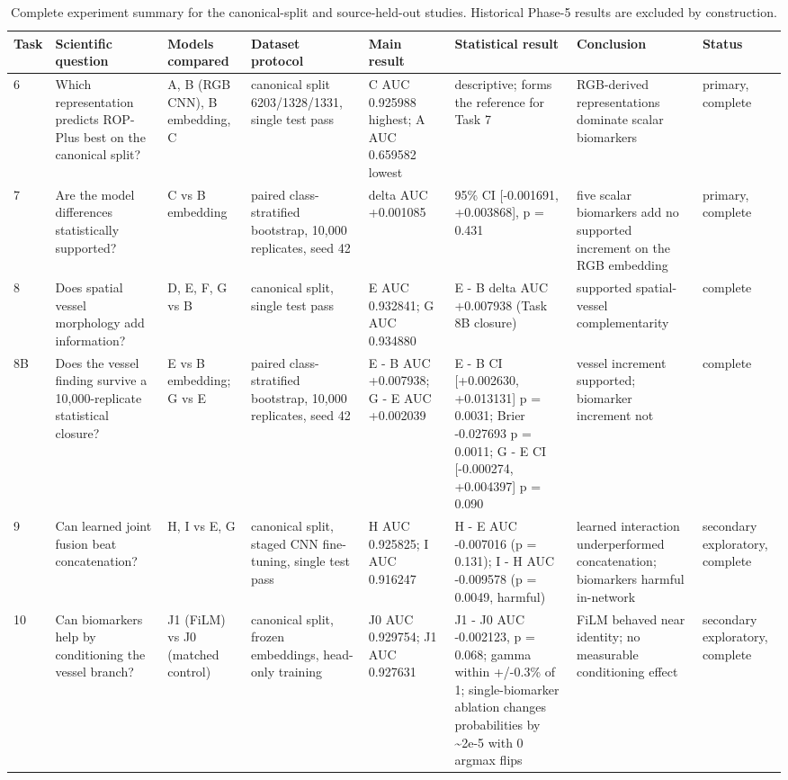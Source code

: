 \begin{table}[htbp]
\centering
\small
\caption{Complete experiment summary for the canonical-split and source-held-out studies. Historical Phase-5 results are excluded by construction.}
\label{tab:experimentsummary}
\begin{tabular}{lp{3.4cm}p{3.0cm}p{3.2cm}p{3.2cm}p{4.0cm}p{3.4cm}p{2.2cm}}
\toprule
Task & Scientific question & Models compared & Dataset protocol & Main result & Statistical result & Conclusion & Status \\
\midrule
6 & Which representation predicts ROP-Plus best on the canonical split? & A, B (RGB CNN), B embedding, C & canonical split 6203/1328/1331, single test pass & C AUC 0.925988 highest; A AUC 0.659582 lowest & descriptive; forms the reference for Task 7 & RGB-derived representations dominate scalar biomarkers & primary, complete \\
7 & Are the model differences statistically supported? & C vs B embedding & paired class-stratified bootstrap, 10,000 replicates, seed 42 & delta AUC +0.001085 & 95\% CI [-0.001691, +0.003868], p = 0.431 & five scalar biomarkers add no supported increment on the RGB embedding & primary, complete \\
8 & Does spatial vessel morphology add information? & D, E, F, G vs B & canonical split, single test pass & E AUC 0.932841; G AUC 0.934880 & E - B delta AUC +0.007938 (Task 8B closure) & supported spatial-vessel complementarity & complete \\
8B & Does the vessel finding survive a 10,000-replicate statistical closure? & E vs B embedding; G vs E & paired class-stratified bootstrap, 10,000 replicates, seed 42 & E - B AUC +0.007938; G - E AUC +0.002039 & E - B CI [+0.002630, +0.013131] p = 0.0031; Brier -0.027693 p = 0.0011; G - E CI [-0.000274, +0.004397] p = 0.090 & vessel increment supported; biomarker increment not & complete \\
9 & Can learned joint fusion beat concatenation? & H, I vs E, G & canonical split, staged CNN fine-tuning, single test pass & H AUC 0.925825; I AUC 0.916247 & H - E AUC -0.007016 (p = 0.131); I - H AUC -0.009578 (p = 0.0049, harmful) & learned interaction underperformed concatenation; biomarkers harmful in-network & secondary exploratory, complete \\
10 & Can biomarkers help by conditioning the vessel branch? & J1 (FiLM) vs J0 (matched control) & canonical split, frozen embeddings, head-only training & J0 AUC 0.929754; J1 AUC 0.927631 & J1 - J0 AUC -0.002123, p = 0.068; gamma within +/-0.3\% of 1; single-biomarker ablation changes probabilities by \textasciitilde{}2e-5 with 0 argmax flips & FiLM behaved near identity; no measurable conditioning effect & secondary exploratory, complete \\

\end{tabular}
\end{table}
